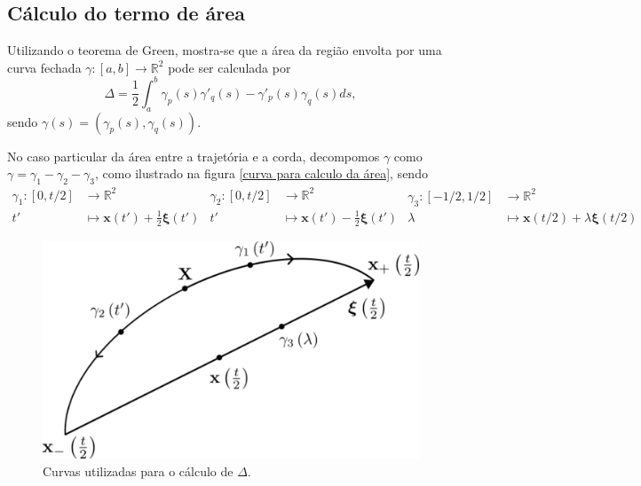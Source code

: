 \documentclass[
	12pt,
	oneside,			%
	a4paper,			%
	english,			%
	brazil				%
	]{abntex2}
\theoremstyle{definition}
\begin{document}
\begin{apendicesenv}
\chapter{Cálculo do termo de área}
\label{Cálculo do termo de área}
Utilizando o teorema de Green, mostra-se que a área da região envolta por uma curva fechada $\gamma:[a,b]\to\mathbb{R}^2$ pode ser calculada por
\begin{equation}
    \Delta = \frac{1}{2}\int_a^b \gamma_p(s) \gamma'_q(s) -  \gamma'_p(s) \gamma_q(s) ds,
\end{equation}
sendo $\gamma(s) = (\gamma_p(s),\gamma_q(s))$.

No caso particular da área entre a trajetória e a corda, decompomos $\gamma$ como $\gamma = \gamma_1  - \gamma_2 - \gamma_3$, como ilustrado na figura \eqref{curva para calculo da área}, sendo
\begin{subequations}
    \begin{equation}
        \begin{aligned}
            \gamma_1 \colon[0,t/2] &\to \mathbb{R}^2\\
            t' &\mapsto  \mathbf{x}(t') + \frac{1}{2}\boldsymbol{\xi}(t')
    \end{aligned}
    \end{equation}
    \begin{equation}
        \begin{aligned}
            \gamma_2 \colon[0,t/2] &\to \mathbb{R}^2\\
            t' &\mapsto  \mathbf{x}(t') - \frac{1}{2}\boldsymbol{\xi}(t')
    \end{aligned}
    \end{equation}
    \begin{equation}
        \begin{aligned}
            \gamma_3 \colon[-1/2,1/2]
             &\to \mathbb{R}^2\\
            \lambda &\mapsto  \mathbf{x}(t/2) + \lambda \boldsymbol{\xi}(t/2)
    \end{aligned}
    \end{equation}
\end{subequations}

\begin{figure}[H]
    \includegraphics[width=.6\textwidth]{Imagens/half_trajectories_v2.png}
    \centering
    \caption{Curvas utilizadas para o cálculo de $\Delta$.}
    \label{curva para calculo da área}
\end{figure}


\end{apendicesenv}
\end{document}
